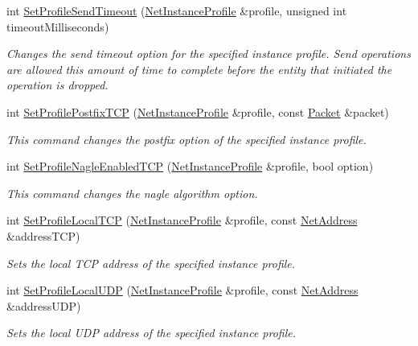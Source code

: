 \begin{DoxyCompactItemize}
int \hyperlink{namespacemn_abc9793b165372548ed3c10b470244efd}{SetProfileSendTimeout} (\hyperlink{class_net_instance_profile}{NetInstanceProfile} \&profile, unsigned int timeoutMilliseconds)
\begin{DoxyCompactList}\small\item\em Changes the send timeout option for the specified instance profile. Send operations are allowed this amount of time to complete before the entity that initiated the operation is dropped. \item\end{DoxyCompactList}\item 
int \hyperlink{namespacemn_a751e72752dfd6b8fe814951f0580bd38}{SetProfilePostfixTCP} (\hyperlink{class_net_instance_profile}{NetInstanceProfile} \&profile, const \hyperlink{class_packet}{Packet} \&packet)
\begin{DoxyCompactList}\small\item\em This command changes the postfix option of the specified instance profile. \item\end{DoxyCompactList}\item 
int \hyperlink{namespacemn_aaf460a06d05ca0a65cd284aeb02b7f89}{SetProfileNagleEnabledTCP} (\hyperlink{class_net_instance_profile}{NetInstanceProfile} \&profile, bool option)
\begin{DoxyCompactList}\small\item\em This command changes the nagle algorithm option. \item\end{DoxyCompactList}\item 
int \hyperlink{namespacemn_a5dd58ab1e4ed9f76eca562f3da2b4f8e}{SetProfileLocalTCP} (\hyperlink{class_net_instance_profile}{NetInstanceProfile} \&profile, const \hyperlink{class_net_address}{NetAddress} \&addressTCP)
\begin{DoxyCompactList}\small\item\em Sets the local TCP address of the specified instance profile. \item\end{DoxyCompactList}\item 
int \hyperlink{namespacemn_ac0959be09dc2abd364d9c209fe6296b6}{SetProfileLocalUDP} (\hyperlink{class_net_instance_profile}{NetInstanceProfile} \&profile, const \hyperlink{class_net_address}{NetAddress} \&addressUDP)
\begin{DoxyCompactList}\small\item\em Sets the local UDP address of the specified instance profile. \item\end{DoxyCompactList}\item 

\end{DoxyCompactItemize}
